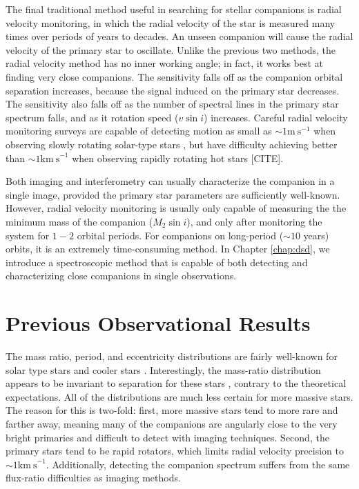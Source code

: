 \documentclass{utthesis}
\begin{document}
The final traditional method useful in searching for stellar companions is radial velocity monitoring, in which the radial velocity of the star is measured many times over periods of years to decades. An unseen companion will cause the radial velocity of the primary star to oscillate. Unlike the previous two methods, the radial velocity method has no inner working angle; in fact, it works best at finding very close companions. The sensitivity falls off as the companion orbital separation increases, because the signal induced on the primary star decreases. The sensitivity also falls off as the number of spectral lines in the primary star spectrum falls, and as it rotation speed ($v\sin{i}$) increases. Careful radial velocity monitoring surveys are capable of detecting motion as small as $\sim 1 \mathrm{m\ s}^{-1}$ when observing slowly rotating solar-type stars \citep[e.g.][]{Wittenmyer2006, Fischer2009, Pepe2011}, but have difficulty achieving better than $\sim 1 \mathrm{km\ s}^{-1}$ when observing rapidly rotating hot stars [CITE].

Both imaging and interferometry can usually characterize the companion in a single image, provided the primary star parameters are sufficiently well-known. However, radial velocity monitoring is usually only capable of measuring the the minimum mass of the companion ($M_2\sin{i}$), and only after monitoring the system for $1-2$ orbital periods. For companions on long-period ($\sim 10$ years) orbits, it is an extremely time-consuming method. In Chapter \ref{chap:dsd}, we introduce a spectroscopic method that is capable of both detecting and characterizing close companions in single observations.


\section{Previous Observational Results}

The mass ratio, period, and eccentricity distributions are fairly well-known for solar type stars \citep{Duquennoy1991, Raghavan2010} and cooler stars \citep{Fischer1992, Delfosse2004}. Interestingly, the mass-ratio distribution appears to be invariant to separation for these stars \citep{Meyer2013}, contrary to the theoretical expectations. All of the distributions are much less certain for more massive stars. The reason for this is two-fold: first, more massive stars tend to more rare and farther away, meaning many of the companions are angularly close to the very bright primaries and difficult to detect with imaging techniques. Second, the primary stars tend to be rapid rotators, which limits radial velocity precision to $\sim 1 \mathrm{km\ s}^{-1}$. Additionally, detecting the companion spectrum suffers from the same flux-ratio difficulties as imaging methods.
\end{document}
